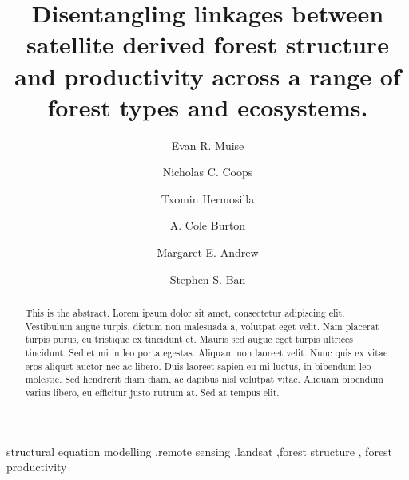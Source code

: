 \documentclass[
  authoryear,
  review,
  3p,
  twocolumn]{elsarticle}
\begin{document}
\begin{frontmatter}
\title{Disentangling linkages between satellite derived forest structure
and productivity across a range of forest types and ecosystems.}
\author[1]{Evan R. Muise%
%
}
\author[1]{Nicholas C. Coops%
%
}
\author[2]{Txomin Hermosilla%
%
}
\author[1]{A. Cole Burton%
%
}
\author[3]{Margaret E. Andrew%
%
}
\author[4]{Stephen S. Ban%
%
}








        
\begin{abstract}
This is the abstract. Lorem ipsum dolor sit amet, consectetur adipiscing
elit. Vestibulum augue turpis, dictum non malesuada a, volutpat eget
velit. Nam placerat turpis purus, eu tristique ex tincidunt et. Mauris
sed augue eget turpis ultrices tincidunt. Sed et mi in leo porta
egestas. Aliquam non laoreet velit. Nunc quis ex vitae eros aliquet
auctor nec ac libero. Duis laoreet sapien eu mi luctus, in bibendum leo
molestie. Sed hendrerit diam diam, ac dapibus nisl volutpat vitae.
Aliquam bibendum varius libero, eu efficitur justo rutrum at. Sed at
tempus elit.
\end{abstract}





\begin{keyword}
    structural equation modelling \sep remote
sensing \sep landsat \sep forest structure \sep 
    forest productivity
\end{keyword}
\end{frontmatter}
    \ifdefined\Shaded\renewenvironment{Shaded}{\begin{tcolorbox}[breakable, sharp corners, interior hidden, frame hidden, enhanced, boxrule=0pt, borderline west={3pt}{0pt}{shadecolor}]}{\end{tcolorbox}}\fi
\end{document}
